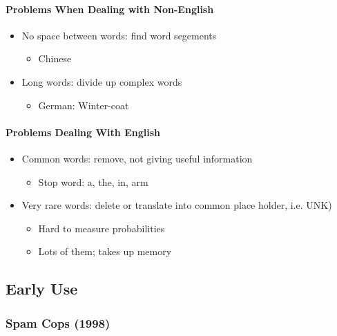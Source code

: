       \paragraph{Problems When Dealing with Non-English}
      \begin{itemize}
        \item No space between words: find word segements
        \begin{itemize}
          \item Chinese
        \end{itemize}

        \item Long words: divide up complex words
        \begin{itemize}
          \item German: Winter-coat
        \end{itemize}
      \end{itemize}

      \paragraph{Problems Dealing With English}
      \begin{itemize}
        \item Common words: remove, not giving useful information
        \begin{itemize}
          \item Stop word: a, the, in, arm
        \end{itemize}

        \item Very rare words: delete or translate into common place holder, i.e. UNK)
        \begin{itemize}
          \item Hard to measure probabilities
          \item Lots of them; takes up memory
        \end{itemize}
      \end{itemize}

  \subsection{Early Use}

    \subsubsection{Spam Cops (1998)}

